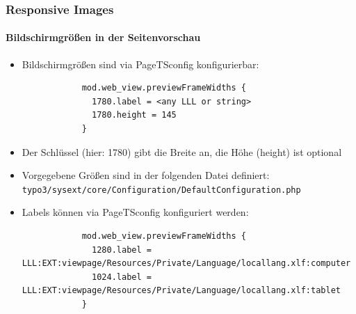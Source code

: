 
\begin{frame}[fragile]
	\frametitle{Responsive Images}
	\framesubtitle{Bildschirmgrößen in der Seitenvorschau}

	\begin{itemize}
		\item Bildschirmgrößen sind via PageTSconfig konfigurierbar:


		\begin{lstlisting}
			mod.web_view.previewFrameWidths {
			  1780.label = <any LLL or string>
			  1780.height = 145
			}
		\end{lstlisting}

		\item Der Schlüssel (hier: 1780) gibt die Breite an, die Höhe (height) ist optional
		\item Vorgegebene Größen sind in der folgenden Datei definiert:\newline
			\small\texttt{typo3/sysext/core/Configuration/DefaultConfiguration.php}\normalsize
		\item Labels können via PageTSconfig konfiguriert werden:

		\begin{lstlisting}
			mod.web_view.previewFrameWidths {
			  1280.label = LLL:EXT:viewpage/Resources/Private/Language/locallang.xlf:computer
			  1024.label = LLL:EXT:viewpage/Resources/Private/Language/locallang.xlf:tablet
			}
		\end{lstlisting}

	\end{itemize}

\end{frame}


